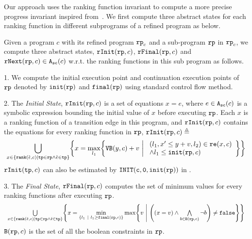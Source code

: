 Our approach uses the ranking function invariant to compute a more precise progress invariant inspired from~\cite{GulwaniJK09}.
We first compute three abstract states for each ranking function in different subprograms of a refined program as below.
\begin{defn}
 \label{def:alg-absstate}
 Given a program $c$ with its refined program $\mathtt{rp}_c$ and a sub-program $\mathtt{rp}$ in $\mathtt{rp}_c$,
 we compute three abstract states, $\mathtt{rInit}(\mathtt{rp}, c)$, $\mathtt{rFinal}(\mathtt{rp}, c)$ and $\mathtt{rNext}(\mathtt{rp}, c) \in {\ensuremath{\mathtt{A_{sc}}}}(c)$ w.r.t. the ranking functions in this sub program as follows.
 
 1. We compute the initial execution point and continuation execution points of $\mathtt{rp}$ denoted by
 $\mathtt{init}(\mathtt{rp})$
 and 
 $\mathtt{final}(\mathtt{rp})$ using standard control flow method.
 
2. The \emph{Initial State}, 
 $\mathtt{rInit}(\mathtt{rp}, c)$ is a set of equations $x = e$, where $e \in {\ensuremath{\mathtt{A_{sc}}}}(c)$ is a
 symbolic expression bounding the initial value of $x$ before executing $\mathtt{rp}$.
 Each $x$ is a ranking function of a transition edge in this program, and $\mathtt{rInit}(\mathtt{rp}, c)$ contains the equations for every ranking function in $\mathtt{rp}$,
 $\mathtt{rInit}(\mathtt{rp}, c) \triangleq $
 {\small
 \[
 \bigcup_{x \in \left\{ \rank(\absevent, c) | \tpath \in \rprog \land \absevent \in \tpath \right\} }
 \left \{ 
 x = \max_{l_1}\left\{
 \varinvar(y, c) + v ~\middle\vert~ 
 \begin{array}{l} 
 (l_1, x' \leq y + v, l_2) \in \reset(x, c) 
 \\
 \land l_1 \leq \absinit(\rprog, c)
 \end{array}
 \right\}
 \right\}
 \]
 }
 $\mathtt{rInit}(\mathtt{tp}, c)$ can also be estimated by $\mathtt{INIT(c, 0, \mathtt{init}(\mathtt{rp}))}$ in \cite{GulwaniJK09}. 

 3. The \emph{Final State}, $\mathtt{rFinal}(\mathtt{rp}, c)$ computes the set of minimum values for every ranking functions
 after executing $\mathtt{rp}$.
 {\small
\[
 \begin{array}{l} 
 \bigcup\limits_{x \in \left\{ \rank(\absevent, c) | \tpath \in \rprog \land \absevent \in \tpath \right\} }
 \left \{ 
 x = \min\limits_{ \left\{ l_1 ~|~ l_1 \geq \absfinal(\rprog, c) \right\} }
 \max\left\{
 v ~\middle\vert~ 
 \left( (x = v) \land \bigwedge\limits_{b \in \kw{B}(\rprog, c)} \neg b \right) \neq \efalse
 \right\}
 \right\}
 \end{array}
 \]
 }
 $\mathtt{B}(\mathtt{rp}, c)$ is the set of all the boolean constraints in $\mathtt{rp}$.


\end{defn}
